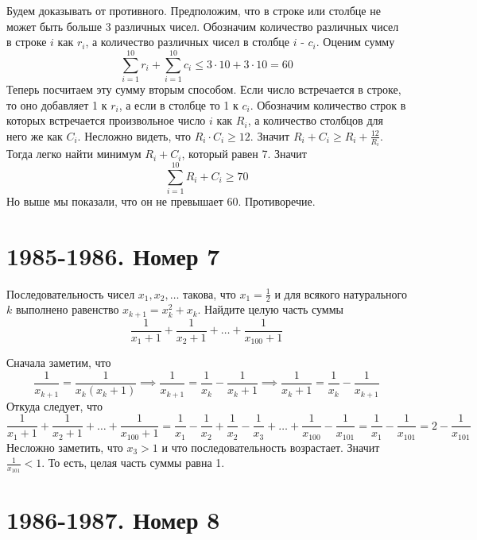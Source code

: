 \documentclass[11pt, a4paper]{common/document_template}
\begin{document}
\begin{Solution}
Будем доказывать от противного. Предположим, что в строке или столбце не может быть больше 3 различных чисел. Обозначим количество различных чисел в строке $i$ как $r_{i}$, а количество различных чисел в столбце $i$ - $c_{i}$. Оценим сумму
$$
\sum_{i = 1}^{10} r_{i} + \sum_{i = 1}^{10} c_{i} \leqslant 3 \cdot 10 + 3 \cdot 10 = 60
$$
Теперь посчитаем эту сумму вторым способом. Если число встречается в строке, то оно добавляет 1 к $r_{i}$, а если в столбце то 1 к $c_{i}$. Обозначим количество строк в которых встречается произвольное число $i$ как $R_{i}$, а количество столбцов для него же как $C_{i}$. Несложно видеть, что $R_{i} \cdot C_{i} \geqslant 12$. Значит $R_{i} + C_{i} \geqslant R_{i} + \frac{12}{R_{i}}$. Тогда легко найти минимум $R_{i} + C_{i}$, который равен 7. Значит
$$
\sum_{i = 1}^{10} R_{i} + C_{i} \geqslant 70
$$
Но выше мы показали, что он не превышает 60. Противоречие.
\end{Solution}

\chapter{1985-1986. Номер 7}

\begin{exercise}
Последовательность чисел $x_{1}, x_{2}, \dots$ такова, что $x_{1} = \frac{1}{2}$ и для всякого натурального $k$ выполнено равенство $x_{k+1} = x_{k}^{2} + x_{k}$. Найдите целую часть суммы
$$
\frac{1}{x_{1}+1} + \frac{1}{x_{2}+1} + \dots + \frac{1}{x_{100}+1}
$$
\end{exercise}

\begin{Solution}
Сначала заметим, что
$$
\frac{1}{x_{k+1}} = \frac{1}{x_{k}(x_{k} + 1)} \implies \frac{1}{x_{k+1}} = \frac{1}{x_{k}} - \frac{1}{x_{k} + 1} \implies  \frac{1}{x_{k} + 1} = \frac{1}{x_{k}} - \frac{1}{x_{k + 1}}
$$
Откуда следует, что
$$
\frac{1}{x_{1}+1} + \frac{1}{x_{2}+1} + \dots + \frac{1}{x_{100}+1} = \frac{1}{x_{1}} - \frac{1}{x_{2}} + \frac{1}{x_{2}} - \frac{1}{x_{3}} + \dots + \frac{1}{x_{100}} - \frac{1}{x_{101}} = \frac{1}{x_{1}} - \frac{1}{x_{101}} = 2 - \frac{1}{x_{101}}
$$
Несложно заметить, что $x_{3} > 1$ и что последовательность возрастает. Значит $\frac{1}{x_{101}} < 1$. То есть, целая часть суммы равна 1.
\end{Solution}

\chapter{1986-1987. Номер 8}
\end{document}
